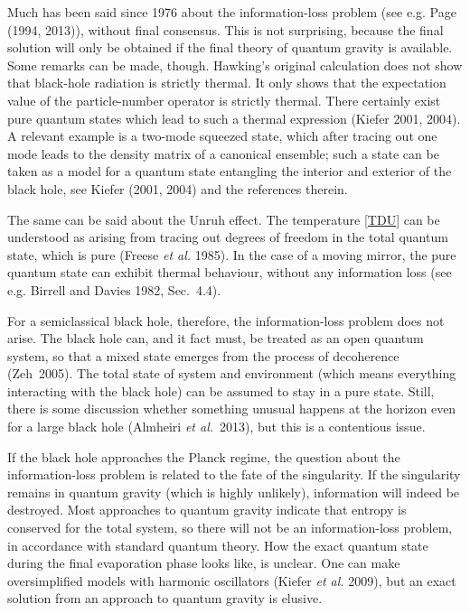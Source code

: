 \documentclass[12pt]{article}
\begin{document}
Much has been said since 1976 about the information-loss problem
(see e.g. Page (1994, 2013)), without final consensus. This is not
surprising, because the final solution will only be obtained if the
final theory of quantum gravity is available. Some remarks can 
be made, though. Hawking's original calculation does not show that
black-hole radiation is strictly thermal. It only shows that the expectation
value of the particle-number operator is strictly thermal. There certainly exist
pure quantum states which lead to such a thermal expression (Kiefer
2001, 2004). A relevant example is a two-mode squeezed state, which
after tracing out one mode leads to the density matrix of a canonical
ensemble; such a state can be taken as a model for a quantum state
entangling the interior and exterior of the black hole, see Kiefer
(2001, 2004) and the references therein. 

The same can be said about the Unruh effect. The temperature
\eqref{TDU} can be understood as arising from tracing out degrees of
freedom in the total quantum state, which is pure (Freese {\em et al.}
1985). In the case of a moving mirror, the pure quantum state can
exhibit thermal behaviour, without any information loss (see
e.g. Birrell and Davies 1982, Sec.~4.4). 

For a semiclassical black hole, therefore, the information-loss
problem does not arise. The black hole can, and it fact must, be
treated as an open quantum system, so that a mixed state emerges from
the process of decoherence (Zeh~2005). The total state of system and
environment (which means everything interacting with the black hole)
can be assumed to stay in a pure state.  Still, there is some
discussion whether something unusual happens at the horizon even for a
large black hole (Almheiri {\em et al.}~2013), but this is a
contentious issue. 

If the black hole approaches the Planck regime, the question about the
information-loss problem is related to the fate of the singularity. 
If the singularity remains in quantum gravity (which is highly
unlikely), information will indeed be destroyed. Most approaches to
quantum gravity indicate that entropy is conserved for the total
system, so there will not be an information-loss problem, in
accordance with standard quantum theory. How the exact quantum state
during the final evaporation phase looks like, is unclear. One can
make oversimplified models with harmonic oscillators (Kiefer {\em et
  al.} 2009), but an exact solution from an approach to quantum
gravity is elusive. 
\end{document}
